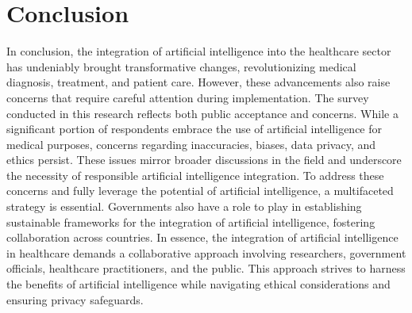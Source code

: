 \documentclass{ieeeaccess}
\begin{document}
\section{Conclusion}
In conclusion, the integration of artificial intelligence into the healthcare sector has undeniably brought transformative changes, revolutionizing medical diagnosis, treatment, and patient care. However, these advancements also raise concerns that require careful attention during implementation. The survey conducted in this research reflects both public acceptance and concerns. While a significant portion of respondents embrace the use of artificial intelligence for medical purposes, concerns regarding inaccuracies, biases, data privacy, and ethics persist. These issues mirror broader discussions in the field and underscore the necessity of responsible artificial intelligence integration. To address these concerns and fully leverage the potential of artificial intelligence, a multifaceted strategy is essential. Governments also have a role to play in establishing sustainable frameworks for the integration of artificial intelligence, fostering collaboration across countries. In essence, the integration of artificial intelligence in healthcare demands a collaborative approach involving researchers, government officials, healthcare practitioners, and the public. This approach strives to harness the benefits of artificial intelligence while navigating ethical considerations and ensuring privacy safeguards.
\end{document}
